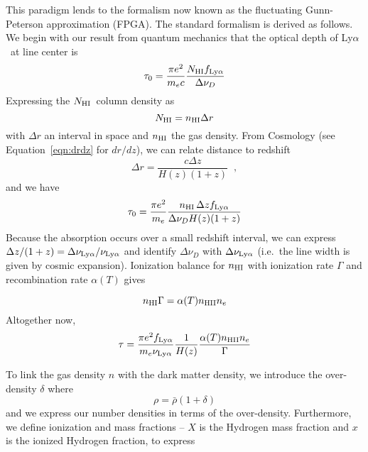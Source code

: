 \documentclass[graybox]{svmult}
\def\lya{Ly$\alpha$}
\newcommand{\mnhi}{N_{\rm HI}}
\newcommand{\nhi}{$\mnhi$}
\begin{document}
This paradigm lends to the formalism now known as the
fluctuating Gunn-Peterson approximation (FPGA).  The
standard formalism is derived as follows.
We begin with our result from quantum mechanics
that the  optical depth of \lya\ at line center is
\begin{equation}
\tau_0 = \frac{\pi e^2}{m_e c} \frac{N_{\rm HI} 
f_{\rm Ly\alpha}}{\Delta \nu_D}
\end{equation}
Expressing the  \nhi\ column density as
\begin{equation}
\mnhi = n_{\rm HI} \Delta r
\end{equation}
with $\Delta r$ an interval in space and $n_{\rm HI}$
the gas density.
From Cosmology (see Equation~\ref{eqn:drdz} for $dr/dz$),
we can relate distance to redshift
\begin{equation}
\Delta r = \frac{c \Delta z}{H(z) (1+z)} \;\; ,
\end{equation}
and we have 
\begin{equation}
\tau_0 = \frac{\pi e^2}{m_e} \frac{n_{\rm HI} \, \Delta z
f_{\rm Ly\alpha}}{\Delta \nu_D H(z) (1+z)}
\end{equation}
Because the absorption occurs over a small redshift interval,
we can express
$\Delta z/(1+z) = \Delta\nu_{\rm Ly\alpha} / \nu_{\rm Ly\alpha}$
and identify $\Delta \nu_D$ with $\Delta \nu_{\rm Ly\alpha}$
(i.e.\ the line width is given by cosmic expansion).
Ionization balance for $n_{\rm HI}$ with ionization rate $\Gamma$
and recombination rate $\alpha(T)$ gives

\begin{equation}
n_{\rm HI} \Gamma = \alpha(T) n_{\rm HII} n_e
\label{eqn:ion_balance}
\end{equation}
Altogether now,
\begin{equation}
\tau = \frac{\pi e^2 f_{\rm Ly\alpha}}{m_e \nu_{\rm Ly\alpha}}
\frac{1}{H(z)} \frac{\alpha(T) n_{\rm HII} n_e}{\Gamma}
\end{equation}

To link the gas density $n$ with the dark
matter density, we introduce the over-density $\delta$
where
\begin{equation}
\rho = \bar\rho (1+\delta)
\label{eqn:overdensity}
\end{equation}
and we express our number densities in terms of the over-density.
Furthermore, we define
ionization and mass fractions  -- $X$ is the Hydrogen mass fraction 
and $x$ is the ionized Hydrogen fraction, to express 
\end{document}
